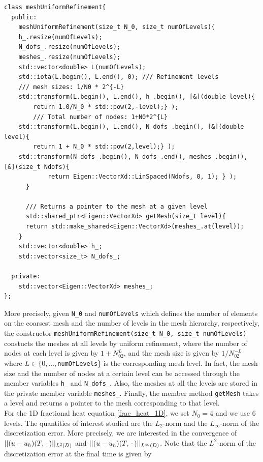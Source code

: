 \begin{lstlisting}[caption={1D uniform refinement.}, label={Refinement1D}]
class meshUniformRefinement{ 
  public: 
    meshUniformRefinement(size_t N_0, size_t numOfLevels){ 
    h_.resize(numOfLevels); 
	N_dofs_.resize(numOfLevels); 
	meshes_.resize(numOfLevels);
	std::vector<double> L(numOfLevels); 
	std::iota(L.begin(), L.end(), 0); /// Refinement levels
	/// mesh sizes: 1/N0 * 2^{-L}
	std::transform(L.begin(), L.end(), h_.begin(), [&](double level){
	    return 1.0/N_0 * std::pow(2,-level);} );	
        /// Total number of nodes: 1+N0*2^{L}
	std::transform(L.begin(), L.end(), N_dofs_.begin(), [&](double level){
	    return 1 + N_0 * std::pow(2,level);} );
	std::transform(N_dofs_.begin(), N_dofs_.end(), meshes_.begin(), [&](size_t Ndofs){
    	    return Eigen::VectorXd::LinSpaced(Ndofs, 0, 1); } ); 
      }
      
      /// Returns a pointer to the mesh at a given level 
      std::shared_ptr<Eigen::VectorXd> getMesh(size_t level){
	  return std::make_shared<Eigen::VectorXd>(meshes_.at(level));
	}
    std::vector<double> h_; 
    std::vector<size_t> N_dofs_; 
   
  private: 
    std::vector<Eigen::VectorXd> meshes_; 
};
\end{lstlisting}
More precisely, given \lstinline{N_0} and \lstinline{numOfLevels} which defines the number of elements on the coarsest mesh and the number of levels in the mesh hierarchy, respectively, the constructor \lstinline{meshUniformRefinement(size_t N_0, size_t numOfLevels)} constucts the meshes at all levels by uniform refinement, where the number of nodes at each level is given by $1+N_02^{L}$, and the mesh size is given by $1/N_02^{-L}$ where $L\in\{0,\dots,$\lstinline{numOfLevels}\} is the corresponding mesh level. In fact, the mesh size and the number of nodes at a certain level can be accessed through the member variables \lstinline{h_} and \lstinline{N_dofs_}. Also, the meshes at all the levels are stored in the private member variable \lstinline{meshes_}. 
Finally, the member method \lstinline{getMesh} takes a level and returns a pointer to the mesh corresponding to that level. \\
For the 1D fractional heat equation \eqref{frac_heat_1D}, we set $N_0 = 4$ and we use 6 levels. The quantities of interest studied are the $L_2$-norm and the $L_{\infty}$-norm of the discretization error. More precisely, we are interested in the convergence of $||(u - u_h)(T,\,\cdot\,)||_{L^{2}(D)}$ and $||(u - u_h)(T,\,\cdot\,)||_{L^{\infty}(D)}$. Note that the $L^2$-norm of the discretization error at the final time is given by
